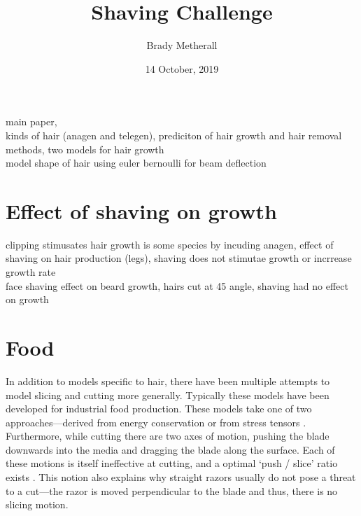 \documentclass[12pt,a4paper]{article}
\title{Shaving Challenge}
\author{Brady Metherall}
\date{14 October, 2019}
\begin{document}
\maketitle

main paper,  \cite{fitt} \\


kinds of hair (anagen and telegen), prediciton of hair growth and hair removal methods, two models for hair growth \cite{kolinko} \\

model shape of hair using euler bernoulli for beam deflection \cite{howison} \\


\section{Effect of shaving on growth}
clipping stimusates hair growth is some species by incuding anagen, effect of shaving on hair production (legs), shaving does not stimutae growth or incrrease growth rate \cite{lynfield} \\
face shaving effect on beard growth, hairs cut at 45 angle, shaving had no effect on growth \cite{trotter} \\



\section{Food}
In addition to models specific to hair, there have been multiple attempts to model slicing and cutting more generally. Typically these models have been developed for industrial food production. These models take one of two approaches---derived from energy conservation \cite{gubenia, zhou} or from stress tensors \cite{zhou}. Furthermore, while cutting there are two axes of motion, pushing the blade downwards into the media and dragging the blade along the surface. Each of these motions is itself ineffective at cutting, and a optimal `push / slice' ratio exists \cite{atkins2004, atkins2005}. This notion also explains why straight razors usually do not pose a threat to a cut---the razor is moved perpendicular to the blade and thus, there is no slicing motion.




\newpage

\end{document}
